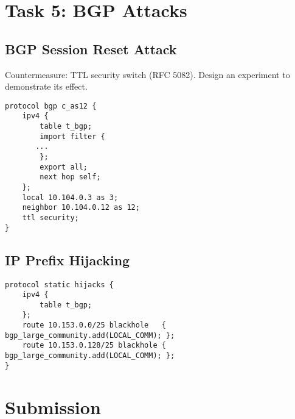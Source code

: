\section{Task 5: BGP Attacks} 


\subsection{BGP Session Reset Attack} 



Countermeasure: TTL security switch (RFC 5082).
Design an experiment to demonstrate its effect.

\begin{lstlisting}
protocol bgp c_as12 {
    ipv4 {
        table t_bgp;
        import filter {
	   ...
        };
        export all;
        next hop self;
    };
    local 10.104.0.3 as 3;
    neighbor 10.104.0.12 as 12;
    ttl security;
}
\end{lstlisting}
 

\subsection{IP Prefix Hijacking} 



\begin{lstlisting}
protocol static hijacks {
    ipv4 {
        table t_bgp;
    };
    route 10.153.0.0/25 blackhole   { bgp_large_community.add(LOCAL_COMM); };
    route 10.153.0.128/25 blackhole { bgp_large_community.add(LOCAL_COMM); };
}
\end{lstlisting}
 


\section{Submission}








